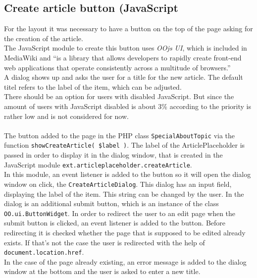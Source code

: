 \subsection{Create article button (JavaScript}
		
For the layout it was necessary to have a button on the top of the page asking for the creation of the article. \\
The JavaScript module to create this button uses \textit{OOjs UI}, which is included in MediaWiki and ``is a library that allows developers to rapidly create front-end web applications that operate consistently across a multitude of browsers.'' \citep{wiki:27} \\
A dialog shows up and asks the user for a title for the new article. The default titel refers to the label of the item, which can be adjusted. \\
There should be an option for users with disabled JavaScript. But since the amount of users with JavaScript disabled is about 3\% according to \citet{wiki:02}  the priority is rather low and is not considered for now. \\
\\
The button added to the page in the PHP class \texttt{\justify SpecialAboutTopic} via the function \texttt{\justify showCreateArticle( \$label )}. The label of the ArticlePlaceholder is passed in order to display it in the dialog window, that is created in the JavaScript module \texttt{\justify ext.articleplaceholder.createArticle}. \\
In this module, an event listener is added to the button so it will open the dialog window on click, the \texttt{CreateArticleDialog}. This dialog has an input field, displaying the label of the item. This string can be changed by the user. In the dialog is an additional submit button, which is an instance of the class \texttt{OO.ui.ButtonWidget}. In order to redirect the user to an edit page when the submit button is clicked, an event listener is added to the button. Before redirecting it is checked whether the page that is supposed to be edited already exists. If that's not the case the user is redirected with the help of \texttt{\justify document.location.href}. \\
In the case of the page already existing, an error message is added to the dialog window at the bottom and the user is asked to enter a new title.